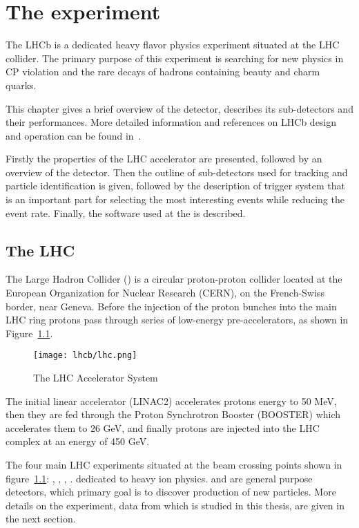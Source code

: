 \chapter{The \lhcb experiment}
\label{ch_lhcb}

The LHCb is a dedicated heavy flavor physics experiment situated at the LHC
collider.
The primary purpose of this experiment is searching for new physics in CP
violation and the rare decays of hadrons containing beauty and charm quarks.

This chapter gives a brief overview of the \lhcb detector, describes its
sub-detectors and their performances. More detailed information and references
on LHCb design and operation can be found in~\cite{Alves:2008zz}.

Firstly the properties of the LHC accelerator are presented, followed by an
overview of the \lhcb detector. Then the outline of sub-detectors used for
tracking and particle identification is given, followed by the description of
trigger system that is an important part for selecting the most interesting
events while reducing the event rate. Finally, the software used at the \lhcb
is described.

\section{The LHC}
\label{ch_lhcb:lhc}

The Large Hadron Collider (\lhc) is a circular proton-proton collider located
at the European Organization for Nuclear Research (CERN), on the French-Swiss
border, near Geneva. Before the injection of the proton bunches into the main
LHC ring protons pass through series of low-energy pre-accelerators, as shown
in Figure~\ref{fig:lhc}.

\begin{figure}[tb]
\centering
\texttt{[image: lhcb/lhc.png]}
\caption{\small The LHC Accelerator System}
\label{fig:lhc}
\end{figure}

The initial linear accelerator (LINAC2) accelerates protons energy to 50 MeV,
then they are fed through the Proton Synchrotron Booster (BOOSTER) which
accelerates them to 26 GeV, and finally protons are injected into the LHC
complex at an energy of 450 GeV.

The four main LHC experiments situated at the beam crossing points shown in
figure~\ref{fig:lhc}: \atlas, \alice, \cms, \lhcb. \alice dedicated to heavy
ion physics. \atlas and \cms are general purpose detectors, which primary goal is
to discover production of new particles. More details on the \lhcb experiment,
data from which is studied in this thesis, are given in the next section.

